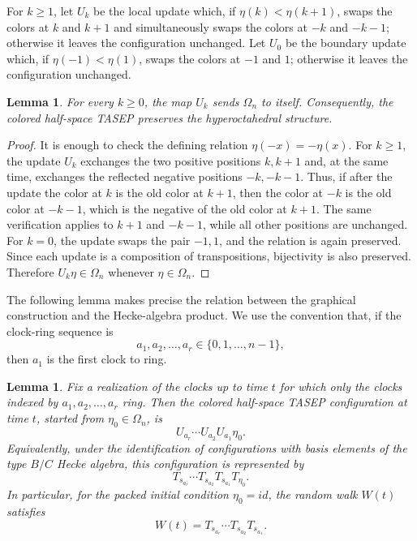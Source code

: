 \documentclass[12pt,a4paper]{amsart}
\newtheorem{lemma}[theorem]{Lemma}
\theoremstyle{remark}
\numberwithin{equation}{section} \numberwithin{theorem}{section}
\begin{document}
For $k\geq1$, let $U_k$ be the local update which, if $\eta(k)<\eta(k+1)$, swaps the colors at $k$ and $k+1$ and simultaneously swaps the colors at $-k$ and $-k-1$; otherwise it leaves the configuration unchanged. 
Let $U_0$ be the boundary update which, if $\eta(-1)<\eta(1)$, swaps the colors at $-1$ and $1$; otherwise it leaves the configuration unchanged.

\begin{lemma}
\label{lem:preserve-hyperoctahedral}
For every $k\geq0$, the map $U_k$ sends $\Omega_n$ to itself. 
Consequently, the colored half-space TASEP preserves the hyperoctahedral structure.
\end{lemma}

\begin{proof}
It is enough to check the defining relation $\eta(-x)=-\eta(x)$. 
For $k\geq1$, the update $U_k$ exchanges the two positive positions $k,k+1$ and, at the same time, exchanges the reflected negative positions $-k,-k-1$. 
Thus, if after the update the color at $k$ is the old color at $k+1$, then the color at $-k$ is the old color at $-k-1$, which is the negative of the old color at $k+1$. 
The same verification applies to $k+1$ and $-k-1$, while all other positions are unchanged. 
For $k=0$, the update swaps the pair $-1,1$, and the relation is again preserved. 
Since each update is a composition of transpositions, bijectivity is also preserved. 
Therefore $U_k\eta\in\Omega_n$ whenever $\eta\in\Omega_n$.
\end{proof}

The following lemma makes precise the relation between the graphical construction and the Hecke-algebra product. 
We use the convention that, if the clock-ring sequence is
\[
a_1,a_2,\ldots,a_r \in \{0,1,\ldots,n-1\},
\]
then $a_1$ is the first clock to ring.

\begin{lemma}
\label{lem:clock-sequence-hecke-product}
Fix a realization of the clocks up to time $t$ for which only the clocks indexed by
$a_1,a_2,\ldots,a_r$ ring. 
Then the colored half-space TASEP configuration at time $t$, started from $\eta_0\in\Omega_n$, is
\[
U_{a_r}\cdots U_{a_2}U_{a_1}\eta_0.
\]
Equivalently, under the identification of configurations with basis elements of the type $B/C$ Hecke algebra, this configuration is represented by
\[
T_{s_{a_r}}\cdots T_{s_{a_2}}T_{s_{a_1}}T_{\eta_0}.
\]
In particular, for the packed initial condition $\eta_0=id$, the random walk $W(t)$ satisfies
\[
W(t)=T_{s_{a_r}}\cdots T_{s_{a_2}}T_{s_{a_1}}.
\]
\end{lemma}
\end{document}
